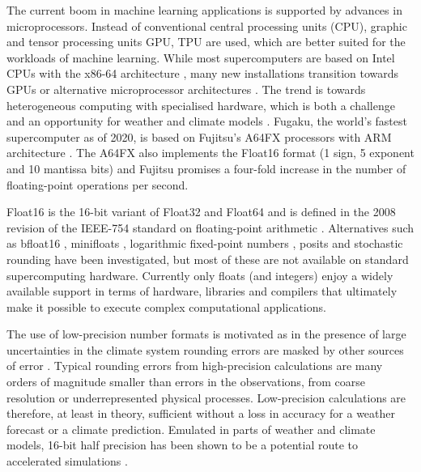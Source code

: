 The current boom in machine learning applications is supported by advances in microprocessors. Instead of conventional central
processing units (CPU), graphic and tensor processing units GPU, TPU \citep{Jouppi2018,Jouppi2018a,Jouppi2017,Steinkraus2005}
are used, which are better suited for the workloads of machine learning. While most supercomputers are based on Intel CPUs with
the x86-64 architecture \citep{Dongarra2011}, many new installations transition towards GPUs or alternative microprocessor architectures
\citep{Zheng2020}. The trend is towards heterogeneous computing with specialised hardware, which is both a challenge and an
opportunity for weather and climate models \citep{Bauer2021,Bauer2021a}. Fugaku, the world’s fastest supercomputer as of 2020,
is based on Fujitsu’s A64FX processors with ARM architecture \citep{Odajima2020,Sato2020}. The A64FX also implements the
Float16 format (1 sign, 5 exponent and 10 mantissa bits) and Fujitsu promises a four-fold increase in the number of floating-point
operations per second. 

Float16 is the 16-bit variant of Float32 and Float64 and is defined in the 2008 revision of the IEEE-754 standard on floating-point arithmetic
\citep{IEEE1985,IEEE2008}. Alternatives such as bfloat16 \citep{Burgess2019, Kalamkar2019}, minifloats \citep{Fox2020}, logarithmic
fixed-point numbers \citep{Johnson2020,Johnson2018,Sun2020}, posits
\citep{Gustafson2017a,Chaurasiya2018,Klower2019a,Klower2020b,Langroudi2019,Zhang2020} and stochastic rounding
\citep{Croci2020,Hopkins2020,Mikaitis2020,Paxton2021} have been investigated, but most of these are not available on
standard supercomputing hardware. Currently only floats (and integers) enjoy a widely available support in terms of hardware,
libraries and compilers that ultimately make it possible to execute complex computational applications.

The use of low-precision number formats is motivated as in the presence of large uncertainties in the climate system rounding
errors are masked by other sources of error \citep{Palmer2015}. Typical rounding errors from high-precision calculations are
many orders of magnitude smaller than errors in the observations, from coarse resolution or underrepresented physical processes.
Low-precision calculations are therefore, at least in theory, sufficient without a loss in accuracy for a weather forecast or a climate prediction.
Emulated in parts of weather and climate models, 16-bit half precision has been shown to be a potential route to accelerated simulations
\citep{Dawson2018,Chantry2019, Hatfield2019, Klower2020b}.

